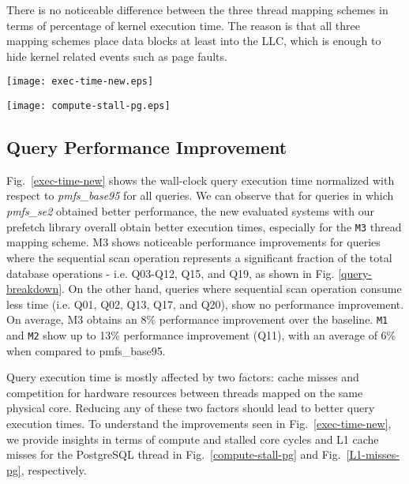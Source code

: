 There is no noticeable difference between the three thread mapping schemes in terms of percentage of kernel execution time. The reason is that all three mapping schemes place data blocks at least into the LLC, which is enough to hide kernel related events such as page faults. 

\begin{figure*}
\centering
\texttt{[image: exec-time-new.eps]}
\caption{Wall-clock execution time normalized with respect to pmfs\_base95}
\label{exec-time-new}
\end{figure*}
\begin{figure*}
\centering
\texttt{[image: compute-stall-pg.eps]}
\caption{Execution time breakdown into compute and stall cycles for PostgreSQL thread, normalized with respect to pmfs\_base95}
\label{compute-stall-pg}
\end{figure*}

\subsection{Query Performance Improvement}\label{QPI}

Fig.~\ref{exec-time-new} shows the wall-clock query execution time normalized with respect to \emph{pmfs\_base95} for all queries. We can observe that for queries in which \emph{pmfs\_se2} obtained better performance, the new evaluated systems with our prefetch library overall obtain better execution times, especially for the \verb+M3+ thread mapping scheme. M3 shows noticeable performance improvements for queries where the sequential scan operation represents a significant fraction of the total database operations - i.e. Q03-Q12, Q15, and Q19, as shown in Fig. \ref{query-breakdown}. On the other hand, queries where sequential scan operation consume less time (i.e. Q01, Q02, Q13, Q17, and Q20), show no performance improvement. On average, M3 obtains an 8\% performance improvement over the baseline. \verb+M1+ and \verb+M2+ show up to 13\% performance improvement (Q11), with an average of 6\% when compared to pmfs\_base95. 

Query execution time is mostly affected by two factors: cache misses and competition for hardware resources between threads mapped on the same physical core. Reducing any of these two factors should lead to better query execution times. To understand the improvements seen in Fig.~\ref{exec-time-new}, we provide insights in terms of compute and stalled core cycles and L1 cache misses for the PostgreSQL thread in Fig.~\ref{compute-stall-pg} and Fig.~\ref{L1-misses-pg}, respectively.

